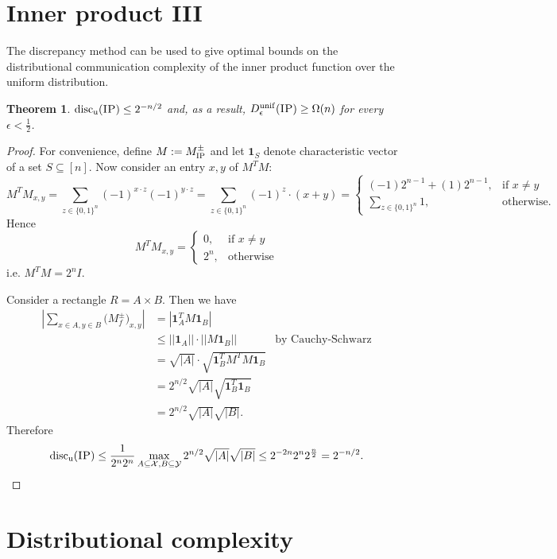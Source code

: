 \documentclass[11pt]{amsart}
\theoremstyle{plain}
\newtheorem{theorem}{Theorem}
\theoremstyle{definition}
\theoremstyle{plain}
\newcommand{\calX}{\mathcal{X}}
\newcommand{\calY}{\mathcal{Y}}
\newcommand{\discu}{\mathrm{disc_u}}
\newcommand{\IP}{\textsc{IP}}
\begin{document}
\newpage \section{Inner product III}

The discrepancy method can be used to give optimal bounds on the distributional communication complexity of the inner product function over the uniform distribution.

\begin{theorem}
$\discu(\IP) \le 2^{-n/2}$ and, as a result, $D_\epsilon^{\mathrm{unif}}(\IP) \ge \Omega(n)$ for every $\epsilon < \frac12$.
\end{theorem}

\begin{proof}
For convenience, define $M:= M^{\pm}_\IP$ and let $\mathbf{1}_S$ denote characteristic vector of a set $S\subseteq [n]$. Now consider an entry $x,y$ of $M^TM$:
$$M^TM_{x,y} = \sum_{z\in\{0,1\}^n} (-1)^{x\cdot z}(-1)^{y\cdot z} = \sum_{z \in \{0,1\}^n}(-1)^z\cdot(x+y) = \begin{cases}
(-1)2^{n-1} + (1)2^{n-1}, &\text{if $x\neq y$} \\
\sum_{z \in \{0,1\}^n}1, &\text{otherwise}.
\end{cases}$$
Hence $$M^TM_{x,y} = \begin{cases}
0, &\text{if $x\neq y$} \\
2^n, &\text{otherwise}
\end{cases}$$
i.e. $M^TM = 2^nI$.

Consider a rectangle $R = A\times B$. Then we have
\begin{align*}
\left| \sum_{x \in A, y \in B} \big(M^{\pm}_f\big)_{x,y} \right|  &= \left| \mathbf{1}_A^T M \mathbf{1}_B\right | \\
&\leq ||\mathbf{1}_A|| \cdot || M\mathbf{1}_B|| &\text{by Cauchy-Schwarz} \\
&= \sqrt{|A|}\cdot\sqrt{\mathbf{1}^T_BM^TM\mathbf{1}_B} \\
&= 2^{n/2}\sqrt{|A|}\sqrt{\mathbf{1}^T_B\mathbf{1}_B} \\
&=2^{n/2}\sqrt{|A|}\sqrt{|B|}.
\end{align*}
Therefore
$$\discu(\IP) \leq \frac{1}{2^n2^n}\max_{A \subseteq \calX, B \subseteq \calY} 2^{n/2}\sqrt{|A|}\sqrt{|B|} \leq 2^{-2n}2^n2^\frac{n}{2} = 2^{-n/2}.$$
\end{proof}


\newpage \section{Distributional complexity}
\end{document}
